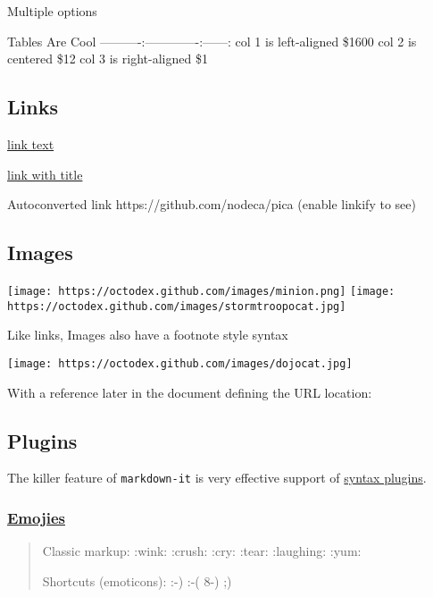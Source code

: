 \documentclass[]{article}
\begin{document}
Multiple options

\textbar{} Tables \textbar{} Are \textbar{} Cool \textbar{}
\textbar{}----------\textbar{}:-------------:\textbar{}------:\textbar{}
\textbar{} col 1 is \textbar{} left-aligned \textbar{} \$1600 \textbar{}
\textbar{} col 2 is \textbar{} centered \textbar{} \$12 \textbar{}
\textbar{} col 3 is \textbar{} right-aligned \textbar{} \$1 \textbar{}

\subsection{Links}

\href{http://dev.nodeca.com}{link text}

\href{http://nodeca.github.io/pica/demo/}{link with title}

Autoconverted link https://github.com/nodeca/pica (enable linkify to
see)

\subsection{Images}

\texttt{[image: https://octodex.github.com/images/minion.png]}
\texttt{[image: https://octodex.github.com/images/stormtroopocat.jpg]}

Like links, Images also have a footnote style syntax

\texttt{[image: https://octodex.github.com/images/dojocat.jpg]}

With a reference later in the document defining the URL location:

\subsection{Plugins}

The killer feature of \texttt{markdown-it} is very effective support of
\href{https://www.npmjs.org/browse/keyword/markdown-it-plugin}{syntax
plugins}.

\subsubsection{\texorpdfstring{\href{https://github.com/markdown-it/markdown-it-emoji}{Emojies}}{Emojies}}

\begin{quote}
Classic markup: :wink: :crush: :cry: :tear: :laughing: :yum:

Shortcuts (emoticons): :-) :-( 8-) ;)
\end{quote}
\end{document}
